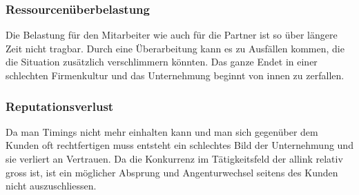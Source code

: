 \subsubsection{Ressourcenüberbelastung}
Die Belastung für den Mitarbeiter wie auch für die Partner ist so über
längere Zeit nicht tragbar. Durch eine Überarbeitung kann es zu Ausfällen kommen, die
die Situation zusätzlich verschlimmern könnten. Das ganze Endet in einer 
schlechten Firmenkultur und das Unternehmung beginnt von innen zu zerfallen.

\subsubsection{Reputationsverlust}
Da man Timings nicht mehr einhalten kann und man sich gegenüber dem Kunden
oft rechtfertigen muss entsteht ein schlechtes Bild der Unternehmung und sie
verliert an Vertrauen. Da die Konkurrenz im Tätigkeitsfeld der allink relativ
gross ist, ist ein möglicher Absprung und Angenturwechsel seitens des Kunden nicht 
auszuschliessen.
